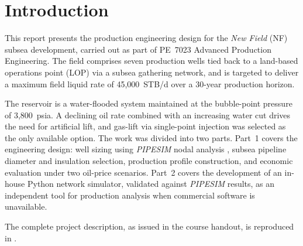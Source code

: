 
\chapter{Introduction}

This report presents the production engineering design for the \emph{New Field} (NF)
subsea development, carried out as part of PE~7023 Advanced Production Engineering.
The field comprises seven production wells tied back to a land-based operations point
(LOP) via a subsea gathering network, and is targeted to deliver a maximum field liquid
rate of 45,000~STB/d over a 30-year production horizon.

The reservoir is a water-flooded system maintained at the bubble-point pressure of
3,800~psia. A declining oil rate combined with an increasing water cut drives the need
for artificial lift, and gas-lift via single-point injection was selected as the only
available option. The work was divided into two parts. Part~1 covers
the engineering design: well sizing using \emph{PIPESIM} nodal analysis
\cite{Schlumberger2023}, subsea pipeline diameter and insulation selection, production
profile construction, and economic evaluation under two oil-price scenarios. Part~2
covers the development of an in-house Python network simulator,
validated against \emph{PIPESIM} results, as an independent tool for production
analysis when commercial software is unavailable.

The complete project description, as issued in the course handout,
is reproduced in .